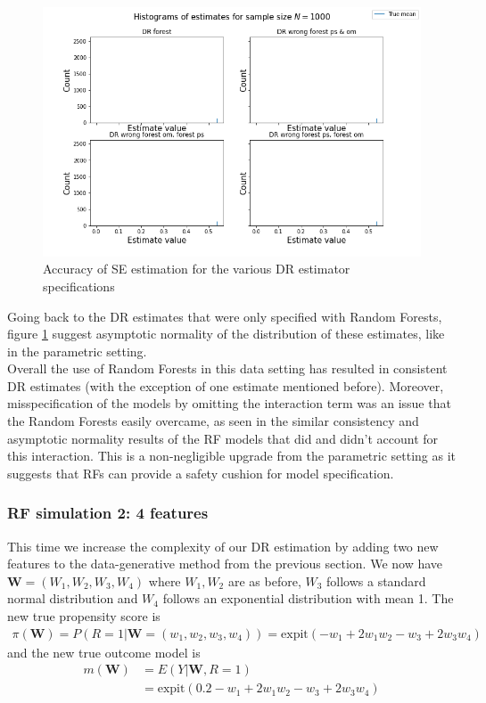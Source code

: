 \documentclass[12pt,twoside]{article}
\newcommand{\expit}{\text{expit}}
\begin{document}
\begin{figure}[h!]
    \centering
    \includegraphics[width = 0.9\columnwidth]{figures/histRF.png}
    \caption{Accuracy of \citet{lunceford_davidian} SE estimation for the various DR estimator specifications}
    \label{fighistRF}
\end{figure}

Going back to the DR estimates that were only specified with Random Forests, figure \ref{fighistRF} suggest asymptotic normality of the distribution of these estimates, like in the parametric setting. \\

Overall the use of Random Forests in this data setting has resulted in consistent DR estimates (with the exception of one estimate mentioned before). Moreover, misspecification of the models by omitting the interaction term was an issue that the Random Forests easily overcame, as seen in the similar consistency and asymptotic normality results of the RF models that did and didn't account for this interaction. This is a non-negligible upgrade from the parametric setting as it suggests that RFs can provide a safety cushion for model specification.

\clearpage
\subsubsection{RF simulation 2: 4 features}

This time we increase the complexity of our DR estimation by adding two new features to the data-generative method from the previous section. We now have $\mathbf{W} = (W_1,W_2,W_3,W_4)$ where $W_1,W_2$ are as before, $W_3$ follows a standard normal distribution and $W_4$ follows an exponential distribution with mean 1. The new true propensity score is 
\begin{align*}
    \pi(\mathbf{W}) = P(R = 1 |\mathbf{W} = (w_1,w_2, w_3,w_4)) = \expit(-w_1 + 2w_1w_2 - w_3 + 2w_3w_4)
\end{align*}
and the new true outcome model is 
\begin{align*}
    m(\mathbf{W}) &= E(Y|\mathbf{W}, R=1) \\
    & = \expit(0.2 - w_1 + 2w_1w_2 - w_3 + 2w_3w_4)
\end{align*}
\end{document}
